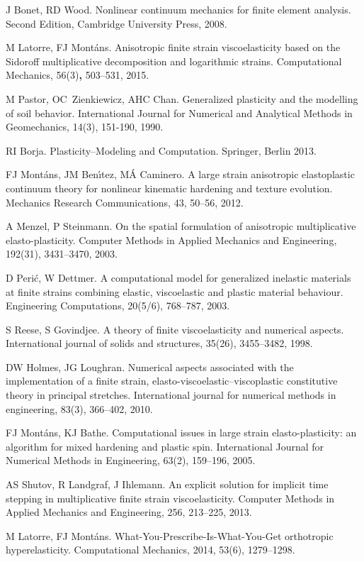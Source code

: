 \documentclass[preprint,review,12pt,sort&compress]{elsarticle}%
\begin{document}
\begin{thebibliography}{99}
J Bonet, RD Wood. Nonlinear continuum mechanics for
finite element analysis. Second Edition, Cambridge University Press, 2008.

M Latorre, FJ Mont\'{a}ns. Anisotropic finite strain
viscoelasticity based on the Sidoroff multiplicative decomposition and
logarithmic strains. Computational Mechanics, 56(3)\textbf{, }503--531, 2015.

M Pastor, OC\ Zienkiewicz, AHC Chan. Generalized plasticity
and the modelling of soil behavior. International Journal for Numerical and
Analytical Methods in Geomechanics, 14(3), 151-190, 1990.

RI Borja. Plasticity--Modeling and Computation. Springer,
Berlin 2013.

FJ Mont\'{a}ns, JM Ben\'{\i}tez, M\'{A}
Caminero. A large strain anisotropic elastoplastic continuum theory for
nonlinear kinematic hardening and texture evolution. Mechanics Research
Communications, 43, 50--56, 2012.

A Menzel, P Steinmann. On the spatial formulation
of anisotropic multiplicative elasto-plasticity. Computer Methods in Applied
Mechanics and Engineering, 192(31), 3431--3470, 2003.

D Peri\'{c}, W Dettmer. A computational model for
generalized inelastic materials at finite strains combining elastic,
viscoelastic and plastic material behaviour. Engineering Computations,
20(5/6), 768--787, 2003.

S Reese, S Govindjee. A theory of finite
viscoelasticity and numerical aspects. International journal of solids and
structures, 35(26), 3455--3482, 1998.

DW Holmes, JG Loughran. Numerical aspects associated
with the implementation of a finite strain, elasto-viscoelastic--viscoplastic
constitutive theory in principal stretches. International journal for
numerical methods in engineering, 83(3), 366--402, 2010.

FJ Mont\'{a}ns, KJ Bathe. Computational issues in
large strain elasto-plasticity: an algorithm for mixed hardening and plastic
spin. International Journal for Numerical Methods in Engineering, 63(2),
159--196, 2005.

AS Shutov, R Landgraf, J Ihlemann. An explicit solution
for implicit time stepping in multiplicative finite strain viscoelasticity.
Computer Methods in Applied Mechanics and Engineering, 256, 213--225, 2013.

M Latorre, FJ Mont\'{a}ns.
What-You-Prescribe-Is-What-You-Get orthotropic hyperelasticity. Computational
Mechanics, 2014, 53(6), 1279--1298.
\end{thebibliography}
\end{document}
